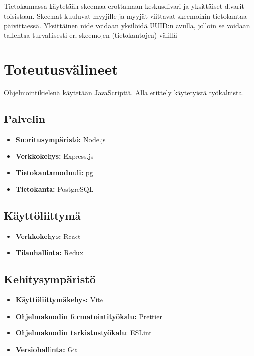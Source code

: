 \documentclass[11pt,a4paper]{article}
\begin{document}
Tietokannassa käytetään skeemaa erottamaan keskusdivari ja yksittäiset divarit toisistaan. Skeemat kuuluvat myyjille ja myyjät viittavat skeemoihin tietokantaa päivittäessä. Yksittäinen nide voidaan yksilöidä UUID:n avulla, jolloin se voidaan tallentaa turvallisesti eri skeemojen (tietokantojen) välillä.

\section{Toteutusvälineet}

Ohjelmointikielenä käytetään JavaScriptiä. Alla erittely käytetyistä työkaluista.

\subsection{Palvelin}

\begin{itemize}
	\item \textbf{Suoritusympäristö:} Node.js
	\item \textbf{Verkkokehys:} Express.js
	\item \textbf{Tietokantamoduuli:} pg
	\item \textbf{Tietokanta:} PostgreSQL
\end{itemize}

\subsection{Käyttöliittymä}

\begin{itemize}
	\item \textbf{Verkkokehys:} React
	\item \textbf{Tilanhallinta:} Redux
\end{itemize}

\subsection{Kehitysympäristö}

\begin{itemize}
	\item \textbf{Käyttöliittymäkehys:} Vite
	\item \textbf{Ohjelmakoodin formatointityökalu:} Prettier
	\item \textbf{Ohjelmakoodin tarkistustyökalu:} ESLint
	\item \textbf{Versiohallinta:} Git
\end{itemize}
\end{document}

